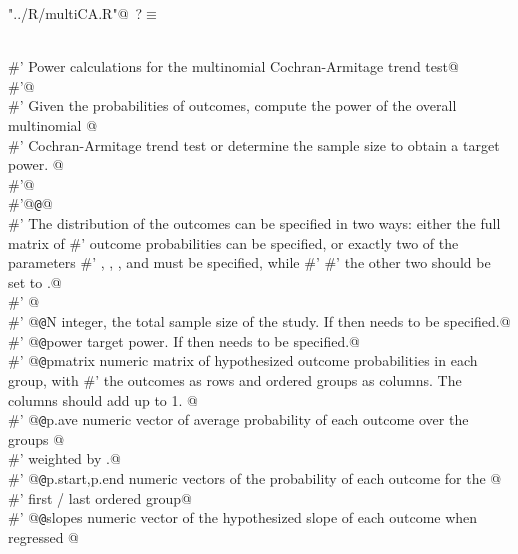 \documentclass[reqno]{amsart}
\renewcommand{\NWtarget}[2]{\hypertarget{#1}{#2}}
\begin{document}
\begin{flushleft} \small\label{scrap10}\raggedright\small
\NWtarget{nuweb?}{} \verb@"../R/multiCA.R"@\nobreak\ {\footnotesize {?}}$\equiv$
\vspace{-1ex}
\begin{list}{}{} \item
\mbox{}\verb@@\\
\mbox{}\verb@#' Power calculations for the multinomial Cochran-Armitage trend test@\\
\mbox{}\verb@#'@\\
\mbox{}\verb@#' Given the probabilities of outcomes, compute the power of the overall multinomial @\\
\mbox{}\verb@#' Cochran-Armitage trend test or determine the sample size to obtain a target power. @\\
\mbox{}\verb@#'@\\
\mbox{}\verb@#'@{\tt @}\verb@details @\\
\mbox{}\verb@#' The distribution of the outcomes can be specified in two ways: either the full matrix of #' outcome probabilities  can be specified, or exactly two of the parameters #' , , , and  must be specified, while #' #' the other two should be set to .@\\
\mbox{}\verb@#' @\\
\mbox{}\verb@#' @{\tt @}\verb@param N integer, the total sample size of the study. If  then  needs to be specified.@\\
\mbox{}\verb@#' @{\tt @}\verb@param power target power. If  then  needs to be specified.@\\
\mbox{}\verb@#' @{\tt @}\verb@param pmatrix numeric matrix of hypothesized outcome probabilities in each group,  with #' the outcomes as rows and ordered groups as columns. The columns should add up to 1. @\\
\mbox{}\verb@#' @{\tt @}\verb@param p.ave numeric vector of average probability of each outcome over the groups  @\\
\mbox{}\verb@#' weighted by .@\\
\mbox{}\verb@#' @{\tt @}\verb@param p.start,p.end numeric vectors of the probability of each outcome for the  @\\
\mbox{}\verb@#' first / last ordered group@\\
\mbox{}\verb@#' @{\tt @}\verb@param slopes numeric vector of the hypothesized slope of each outcome when regressed  @\\

\end{list}
\end{flushleft}
\end{document}

